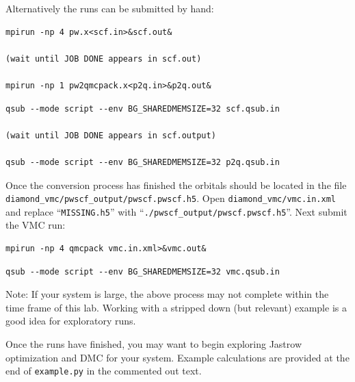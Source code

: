 Alternatively the runs can be submitted by hand:
\ifws
\begin{shaded}
\begin{verbatim}
mpirun -np 4 pw.x<scf.in>&scf.out&

(wait until JOB DONE appears in scf.out)

mpirun -np 1 pw2qmcpack.x<p2q.in>&p2q.out&
\end{verbatim}
\end{shaded}
\else
\begin{shaded}
\begin{verbatim}
qsub --mode script --env BG_SHAREDMEMSIZE=32 scf.qsub.in

(wait until JOB DONE appears in scf.output)

qsub --mode script --env BG_SHAREDMEMSIZE=32 p2q.qsub.in
\end{verbatim}
\end{shaded}
\fi
Once the conversion process has finished the orbitals should be located in the file \newline \texttt{diamond\_vmc/pwscf\_output/pwscf.pwscf.h5}.  Open \texttt{diamond\_vmc/vmc.in.xml} and replace ``\texttt{MISSING.h5}'' with ``\texttt{./pwscf\_output/pwscf.pwscf.h5}''.  Next submit the VMC run:
\ifws
\begin{shaded}
\begin{verbatim}
mpirun -np 4 qmcpack vmc.in.xml>&vmc.out&
\end{verbatim}
\end{shaded}
\else
\begin{shaded}
\begin{verbatim}
qsub --mode script --env BG_SHAREDMEMSIZE=32 vmc.qsub.in
\end{verbatim}
\end{shaded}
\fi
Note: If your system is large, the above process may not complete within the time frame of this lab.  Working with a stripped down (but relevant) example is a good idea for exploratory runs.

Once the runs have finished, you may want to begin exploring Jastrow optimization and DMC for your system.  Example calculations are provided at the end of \texttt{example.py} in the commented out text.




